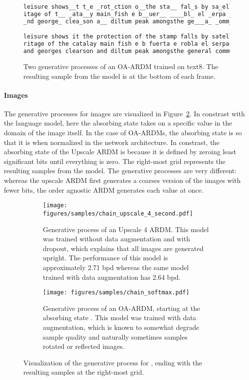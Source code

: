 \documentclass{article} \usepackage{iclr2022_conference,times}
\begin{document}
\begin{figure}[H]
\begin{minipage}{.999\textwidth}
\begin{lstlisting}[language=java]
leisure shows__t t_e _rot_ction o__the sta__ fal_s by sa_ellite _oard_a_d troo_s __ce tenu_ he_
itage of t__ _ata__y main_fish e b__uer__ ____bl_ el _erpa _d_n_a_ tin_a__s island compo_it_on 
_nd george_ clea_son a__ diltum peak amongsthe ge___a_ _omm_

leisure shows it the protection of the stamp falls by satellite board and troops lace tenua he
ritage of the catalay main fish e b fuerta e robla el serpa eden at tingalas island composition
and georges clearson and diltum peak amongsthe general commu
\end{lstlisting}
\end{minipage}
\caption{Two generative processes of an OA-ARDM trained on text8. The resulting sample from the model is at the bottom of each frame.}
\label{fig:oa_ardm_chain_text8}
\end{figure}
\newpage


\paragraph{Images} The generative processes for images are visualized in Figure~\ref{fig:ardm_chain_cifar10_appendix}. In constrast with the language model, here the absorbing state takes on a specific value in the domain of the image itself. In the case of OA-ARDMs, the absorbing state is  so that it is  when normalized in the network architecture. In constrast, the absorbing state of the Upscale ARDM is  because it is defined by zeroing least significant bits until everything is zero. The right-most grid represents the resulting samples from the model. The generative processes are very different: whereas the upscale ARDM first generates a coarses version of the images with fewer bits, the order agnostic ARDM generates each value at once.


\begin{figure}[H]
\centering
\begin{subfigure}{\textwidth}
    \texttt{[image: figures/samples/chain\_upscale\_4\_second.pdf]}
\caption{Generative process of an Upscale 4 ARDM. This model was trained without data augmentation and with dropout, which explains that all images are generated upright. The performance of this model is approximately 2.71 bpd whereas the same model trained with data augmentation has 2.64 bpd.}
\end{subfigure}
\begin{subfigure}{\textwidth}
    \texttt{[image: figures/samples/chain\_softmax.pdf]}
\caption{Generative process of an OA-ARDM, starting at the absorbing state . This model was trained with data augmentation, which is known to somewhat degrade sample quality and naturally sometimes samples rotated or reflected images.}
\end{subfigure}
\caption{Visualization of the generative process for , ending with the resulting samples at the right-most grid.}
\label{fig:ardm_chain_cifar10_appendix}
\end{figure} 
\newpage
\end{document}
